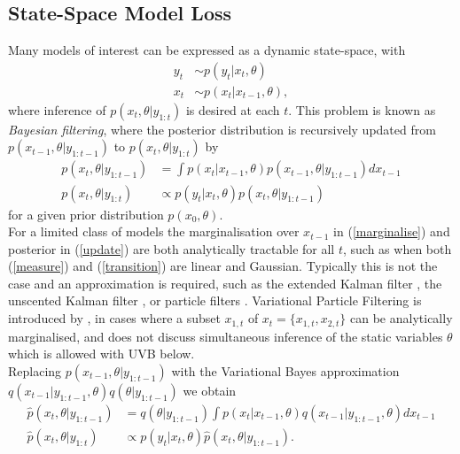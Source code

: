 \documentclass[12pt,a4paper]{article}\usepackage[]{graphicx}\usepackage[]{color}
\begin{document}
\subsection{State-Space Model Loss}

Many models of interest can be expressed as a dynamic state-space, with
\begin{align}
y_t &\sim p(y_t | x_{t}, \theta) \label{measure} \\
x_t &\sim p(x_t | x_{t-1}, \theta) \label{transition} ,
\end{align}
where inference of $p(x_t, \theta | y_{1:t})$ is desired at each $t$. This problem is known as \textit{Bayesian filtering}, where the posterior distribution is recursively updated from $p(x_{t-1}, \theta | y_{1:t-1})$ to $p(x_t, \theta | y_{1:t})$ by
\begin{align}
p(x_t, \theta | y_{1:t-1}) &= \int p(x_t | x_{t-1}, \theta) p(x_{t-1}, \theta | y_{1:t-1})dx_{t-1} \label{marginalise} \\
p(x_t, \theta | y_{1:t}) &\propto p(y_t | x_t, \theta) p(x_t, \theta | y_{1:t-1}) \label{update}
\end{align}
for a given prior distribution $p(x_0, \theta)$. 
\\

For a limited class of models the marginalisation over $x_{t-1}$ in (\ref{marginalise}) and posterior in (\ref{update}) are both analytically tractable for all $t$, such as when both (\ref{measure}) and (\ref{transition}) are linear and Gaussian. Typically this is not the case and an approximation is required, such as the extended Kalman filter \citep{Anderson1979}, the unscented Kalman filter \citep{Wan2000}, or particle filters \citet{Arulampalam2002}. Variational Particle Filtering is introduced by \citet{Smidl2008}, in cases where a subset $x_{1, t}$ of $x_t = \{x_{1, t}, x_{2, t}\}$ can be analytically marginalised, and does not discuss simultaneous inference of the static variables $\theta$ which is allowed with UVB below.
\\

Replacing $p(x_{t-1}, \theta | y_{1:t-1})$ with the Variational Bayes approximation $q(x_{t-1} | y_{1:t-1}, \theta)q(\theta|y_{1:t-1})$ we obtain 
\begin{align}
\hat{p}(x_t, \theta | y_{1:t-1}) &= q(\theta | y_{1:t-1}) \int p(x_t | x_{t-1}, \theta) q(x_{t-1} | y_{1:t-1}, \theta)dx_{t-1} \label{marginaliseHat} \\
\hat{p}(x_t, \theta | y_{1:t}) &\propto p(y_t | x_t, \theta)\hat{p}(x_t, \theta | y_{1:t-1}). \label{updateHat}
\end{align}
\end{document}
